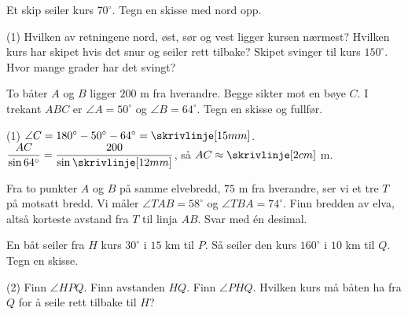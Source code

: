 
Et skip seiler kurs $70^\circ$. Tegn en skisse med nord opp.
\begin{tasks}(1)
  \task Hvilken av retningene nord, øst, sør og vest ligger kursen nærmest?
  \task Hvilken kurs har skipet hvis det snur og seiler rett tilbake?
  \task Skipet svinger til kurs $150^\circ$. Hvor mange grader har det svingt?
\end{tasks}

To båter $A$ og $B$ ligger $200$ m fra hverandre. Begge sikter mot en bøye $C$. I trekant $ABC$ er $\angle A = 50^\circ$ og $\angle B = 64^\circ$. Tegn en skisse og fullfør.
\begin{tasks}(1)
  \task $\angle C = 180^\circ - 50^\circ - 64^\circ = \skrivlinje[15mm]$.
  \task $\dfrac{AC}{\sin 64^\circ} = \dfrac{200}{\sin\skrivlinje[12mm]}$, så $AC \approx \skrivlinje[2cm]$ m.
\end{tasks}


\begin{minipage}[t]{0.50\linewidth}
Fra to punkter $A$ og $B$ på samme elvebredd, $75$ m fra hverandre, ser vi et tre $T$ på motsatt bredd. Vi måler $\angle TAB = 58^\circ$ og $\angle TBA = 74^\circ$. Finn bredden av elva, altså korteste avstand fra $T$ til linja $AB$. Svar med én desimal.
\end{minipage}\hfill
\begin{minipage}[t]{0.47\linewidth}
\centering
{}
\end{minipage}

En båt seiler fra $H$ kurs $30^\circ$ i $15$ km til $P$. Så seiler den kurs $160^\circ$ i $10$ km til $Q$. Tegn en skisse.
\begin{tasks}(2)
  \task Finn $\angle HPQ$.
  \task Finn avstanden $HQ$.
  \task Finn $\angle PHQ$.
  \task Hvilken kurs må båten ha fra $Q$ for å seile rett tilbake til $H$?
\end{tasks}


